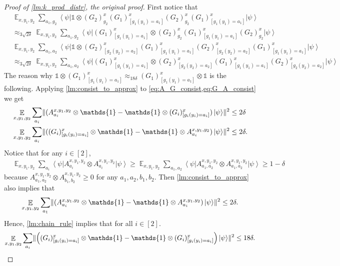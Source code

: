 \documentclass[11pt]{article}
\theoremstyle{plain}
\theoremstyle{definition}
\DeclarePairedDelimiter{\norm}{\lVert}{\rVert}
\newcommand {\bra} [1] {\ensuremath{ \left\langle #1 \right| }}
\newcommand {\ket} [1] {\ensuremath{ \left| #1 \right\rangle }}
\DeclareMathOperator*{\bigE}{\mathbb{E}}
\newcommand {\id} {\ensuremath{\mathds{1}}}
\newcommand{\x}{\otimes}
\newcommand{\appd}[1]{\approx_{#1}}
\newcommand{\1}{\mathbb{1}} %
\begin{document}
\begin{proof}[Proof of \cref{lm:k_prod_distr}, the original proof]
	First notice that 
	\begin{align*}
		&\bigE_{x,y_1,y_2} \sum_{a_1, g_2} \bra{\psi} 
		\id \x (G_2)^x_{g_2} (G_1)^x_{[g_1(y_1) = a_1]}   (G_2)^x_{g_2}  (G_1)^x_{[g_1(y_1) = a_1]}  \ket{\psi} \\
		 &\appd{ 3\sqrt{2\delta}}
		\bigE_{x,y_1,y_2} \sum_{a_1, g_2} \bra{\psi}(G_1)^x_{[g_1(y_1) = a_1]} \x  (G_2)^x_{g_2} (G_1)^x_{[g_1(y_1) = a_1]}   (G_2)^x_{g_2}  \ket{\psi} \\
		&\bigE_{x,y_1,y_2} \sum_{a_1, a_2} \bra{\psi}  \id \x 
		(G_2)^x_{[g_2(y_2) = a_2]} (G_1)^x_{[g_1(y_1) = a_1]}  (G_2)^x_{[g_2(y_2) = a_2]} (G_1)^x_{[g_1(y_1) = a_1]} \ket{\psi} \\
		& \appd{3\sqrt{2\delta}}  \bigE_{x,y_1,y_2} \sum_{a_1, a_2} \bra{\psi}  (G_1)^x_{[g_1(y_1) = a_1]} \x 
		(G_2)^x_{[g_2(y_2) = a_2]} (G_1)^x_{[g_1(y_1) = a_1]}  (G_2)^x_{[g_2(y_2) = a_2]}  \ket{\psi}
	\end{align*}
	The reason why $\id \x (G_1)^x_{[g_1(y_1) = a_1]} \appd{18\delta}  (G_1)^x_{[g_1(y_1) = a_1]} \x \id$ is the following.
	Applying \cref{lm:consist_to_approx} to \cref{eq:A_G_consist,eq:G_A_consist} we get
	\begin{align*}
		&\bigE_{x,y_1,y_2} \sum_{a_i} \norm{ (A^{x,y_1,y_2}_{a_i} \x \id - \id \x (G_i)^x_{[g_i(y_i)=a_i]})\ket{\psi}}^2 \leq 2\delta \\
		&\bigE_{x,y_1,y_2} \sum_{a_i} \norm{ ((G_i)^x_{[g_i(y_i)=a_i]} \x \id - \id \x  A^{x,y_1, y_2}_{a_i} )\ket{\psi}}^2 \leq 2\delta.
	\end{align*}
	Notice that for any $i \in [2]$, 
	\begin{align*}
		&\bigE_{x,y_1,y_2} \sum_{a_i}  \bra{\psi} A^{x,y_1, y_2}_{a_i} \x A^{x,y_1,y_2}_{a_i} \ket{\psi} \geq
		\bigE_{x,y_1,y_2} \sum_{a_1,a_2} \bra{\psi} A^{x,y_1, y_2}_{a_1,a_2} \x A^{x,y_1, y_2}_{a_1,a_2} \ket{\psi}
		\geq 1 - \delta 
	\end{align*}
	because $A^{x,y_1, y_2}_{a_1,a_2} \x A^{x,y_1, y_2}_{b_1,b_2} \geq 0$ for any $a_1, a_2,b_1,b_2$.
	Then \cref{lm:consist_to_approx} also implies that 
	\begin{align*}
		\bigE_{x,y_1,y_2} \sum_{a_1} \norm{ (A^{x,y_1, y_2}_{a_i} \x \id - \id \x  A^{x,y_1, y_2}_{a_i})
		\ket{\psi}}^2 \leq 2 \delta.
	\end{align*}
	Hence, \cref{lm:chain_rule} implies that for all $i \in [2]$.
	\begin{align*}
		\bigE_{x,y_1,y_2} \sum_{a_i} \norm{ \Big( (G_i)^x_{[g_i(y_i)=a_i]} \x \id - \id \x (G_i)^x_{[g_i(y_i) = a_i]} \Big) \ket{\psi}}^2 \leq 18\delta.

\end{align*}
\end{proof}
\end{document}
